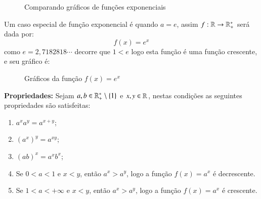    \begin{figure}[H]
 \centering
    \caption{Comparando gráficos de funções exponenciais}
  \end{figure}


  \begin{exem} \label{ex:exp-e}
  Um caso especial de função exponencial é quando $a= e$, assim $f: \mathbb{R} \rightarrow \mathbb{R}_{+}^{*} $ será dada por:
  \[f(x) = e^x\]
  como $e= 2,7182818 \cdots$ decorre que $1 < e$ logo esta função é uma função crescente, e seu gráfico é:

  \begin{figure}[H]
 \centering
    \caption{Gráficos da função $f(x)= e^x$}
  \end{figure}
  \end{exem}

 \textbf{Propriedades:} Sejam $a, b \in \mathbb{R}_{+}^{*} \setminus \{1\}$ e $x, y \in \mathbb{R}$, nestas condições as seguintes propriedades são satisfeitas:
 \begin{enumerate}
  \item $a^x a^y= a^{x+y}$;
  \item $(a^x)^y= a^{xy}$;
  \item $(ab)^x= a^x b^x$;
  \item Se $0 < a < 1$ e $x < y$, então $a^x > a^y$, logo a função $f(x)= a^x$ é decrescente.
  \item Se $1 < a < +\infty$ e $x < y$, então $a^x > a^y$, logo a função $f(x)= a^x$ é crescente.
 \end{enumerate}
 
